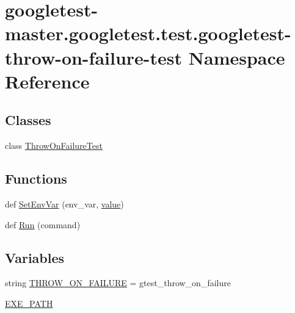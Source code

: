 \hypertarget{namespacegoogletest-master_1_1googletest_1_1test_1_1googletest-throw-on-failure-test}{}\section{googletest-\/master.googletest.\+test.\+googletest-\/throw-\/on-\/failure-\/test Namespace Reference}
\label{namespacegoogletest-master_1_1googletest_1_1test_1_1googletest-throw-on-failure-test}
\subsection*{Classes}
\begin{DoxyCompactItemize}
\item 
class \mbox{\hyperlink{classgoogletest-master_1_1googletest_1_1test_1_1googletest-throw-on-failure-test_1_1_throw_on_failure_test}{Throw\+On\+Failure\+Test}}
\end{DoxyCompactItemize}
\subsection*{Functions}
\begin{DoxyCompactItemize}
\item 
def \mbox{\hyperlink{namespacegoogletest-master_1_1googletest_1_1test_1_1googletest-throw-on-failure-test_a174db536dfcbe634815eb300090c6aaf}{Set\+Env\+Var}} (env\+\_\+var, \mbox{\hyperlink{_obj__test_2lib_2googletest-master_2googlemock_2test_2gmock-matchers__test_8cc_a337b8a670efc0b086ad3af163f3121b6}{value}})
\item 
def \mbox{\hyperlink{namespacegoogletest-master_1_1googletest_1_1test_1_1googletest-throw-on-failure-test_a347d782db7f176742e810f0284c32753}{Run}} (command)
\end{DoxyCompactItemize}
\subsection*{Variables}
\begin{DoxyCompactItemize}
\item 
string \mbox{\hyperlink{namespacegoogletest-master_1_1googletest_1_1test_1_1googletest-throw-on-failure-test_a3742eb22b5b357f211b5271d4a908a49}{T\+H\+R\+O\+W\+\_\+\+O\+N\+\_\+\+F\+A\+I\+L\+U\+RE}} = \textquotesingle{}gtest\+\_\+throw\+\_\+on\+\_\+failure\textquotesingle{}
\item 
\mbox{\hyperlink{namespacegoogletest-master_1_1googletest_1_1test_1_1googletest-throw-on-failure-test_a6ca5a3e10a7b8ea2707dc7bd41c3d131}{E\+X\+E\+\_\+\+P\+A\+TH}}
\end{DoxyCompactItemize}


